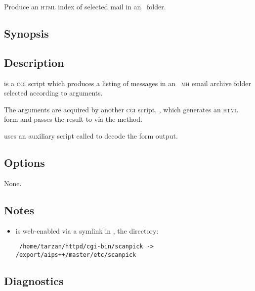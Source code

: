 Produce an \textsc{html} index of selected mail in an \aipspp\ folder.

\subsection*{Synopsis}

\begin{synopsis}
\end{synopsis}

\subsection*{Description}

 is a \textsc{cgi} script which produces a 
listing of messages in an \aipspp\ \textsc{mh} email archive folder selected
according to  arguments.

The  arguments are acquired by another \textsc{cgi} script,
, which generates an \textsc{html} form and passes the result
to  via the  method.

 uses an auxiliary  script called
 to decode the form output.

\subsection*{Options}

None.

\subsection*{Notes}

\begin{itemize}
\item
    is web-enabled via a symlink in
   , the  
   directory:

\begin{verbatim}
 /home/tarzan/httpd/cgi-bin/scanpick -> /export/aips++/master/etc/scanpick
\end{verbatim}
\end{itemize}

\subsection*{Diagnostics}

